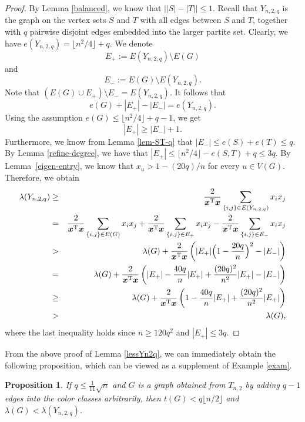 \documentclass[11pt]{article}
\newtheorem{proposition}[theorem]{Proposition}
\begin{document}
\begin{proof}
By Lemma \ref{balanced}, we know 
that $\bigl| |S|-|T| \bigr|\le 1$. 
Recall that $Y_{n,2,q}$ is the graph on the vertex sets 
 $S$ and $T$ with all edges between $S$ and $T$, together with 
$q$ pairwise disjoint edges embedded 
into the larger partite set. 
 Clearly, we have $e(Y_{n,2,q})=  \lfloor n^2/4\rfloor +q$. 
We denote 
\[  E_{+}:=E(Y_{n,2,q})\setminus E(G) \] 
 and 
 \[ E_{-} :=E(G)\setminus E(Y_{n,2,q}). \]  
 Note that $(E(G) \cup E_+) \setminus E_- = E(Y_{n,2,q})$. 
 It follows that 
 \[  e(G)+|E_+| - |E_-|=e(Y_{n,2,q}). \]  
 Using the assumption 
 $  e(G) \le  \lfloor n^2/4\rfloor +q -1$,  we get 
    \[   |E_+| \geq |E_-| + 1.\] 
    Furthermore, we know from Lemma \ref{lem-ST-q} that 
    $|E_-| \leq e(S) + e(T) \le q$. 
    By  Lemma \ref{refine-degree}, 
    we have that $|E_+| \le \lfloor {n^2}/{4} 
    \rfloor- e(S,T) + q \le 3q$. 
    By  Lemma~\ref{eigen-entry}, we know that 
    ${x}_u > 1- {(20q)}/{n}$ for every $u\in V(G)$. Therefore, we obtain 
\begin{eqnarray*}
\lambda (Y_{n,2,q}) &\geq & 
\frac{2}{\bm{x}^{\mathrm{T}} \bm{x}}
 \sum_{\{i,j\}\in E(Y_{n,2,q})} {x}_i {x}_j  \\
&= & \frac{2}{\bm{x}^{\mathrm{T}} \bm{x}} \sum_{\{i,j\} \in E(G)}  
{x}_i {x}_j  
+\frac{2}{\bm{x}^{\mathrm{T}} \bm{x}} \sum_{\{i,j\} \in E_+}  
{x}_i {x}_j - \frac{2}{\bm{x}^{\mathrm{T}} \bm{x}} \sum_{\{i,j\}\in E_-}  {x}_i {x}_j \\
& >  &
\lambda (G) + \frac{2}{\bm{x}^{\mathrm{T}} \bm{x}} 
\left( |E_+| \Bigl(1 - \frac{20q}{n}\Bigr)^2 - |E_-|\right)\\
& =& \lambda (G) + \frac{2}{\bm{x}^{\mathrm{T}} \bm{x}} \left( |E_+|  -\frac{40q}{n}  |E_+| + 
\frac{(20q)^2}{n^2}  |E_+| - |E_-| \right)\\
& \geq& \lambda (G) + \frac{2}{\bm{x}^{\mathrm{T}} \bm{x}} \left( 1-\frac{40q}{n}  |E_+| +\frac{(20q)^2}{n^2}  |E_+| \right)\\
&>& \lambda (G) , 
\end{eqnarray*}
where the last inequality holds since $n\ge 120q^2$ and $|E_+| \le 3q$. 
\end{proof}


From the above proof of Lemma \ref{lessYn2q}, 
we can immediately obtain the following proposition, which can be viewed as a supplement of Example \ref{exam}.  


\begin{proposition}
    If $q\le \frac{1}{11}\sqrt{n}$ and $G$ is a graph obtained from $T_{n,2}$ 
    by adding $q-1$ edges into the color classes arbitrarily, 
    then $t(G)< q \lfloor {n}/{2}\rfloor$ and 
$ \lambda (G) < \lambda (Y_{n,2,q})$. 
\end{proposition}
\end{document}
